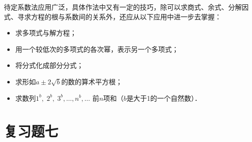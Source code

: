 待定系数法应用广泛，具体作法中又有一定的技巧，除可以求商式、余式、分解因式、寻求方程的根与系数间的关系外，还应从以下应用中进一步去掌握：
\begin{itemize}
    \item 求多项式与解方程；
    \item    用一个较低次的多项式的各次幂，表示另一个多项式；
    \item     将分式化成部分分式；
    \item 求形如$a\pm 2\sqrt{b}$的数的算术平方根；
    \item 求数列$1^b,\; 2^b,\; 3^b, \ldots,n^b,\ldots$ 前$n$项和（$b$是大于1的一个自然数）．
\end{itemize}


\section*{复习题七}

